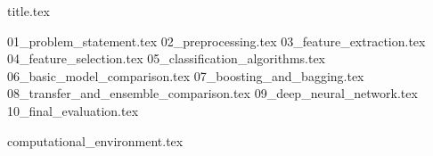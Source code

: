 \documentclass[a4paper,11pt]{article}
\begin{document}
\hypersetup{pageanchor=false}
{title.tex}

\frontmatter
\hypersetup{pageanchor=true}
\tableofcontents
\listoffigures
\listoftables

\mainmatter

{01_problem_statement.tex}
{02_preprocessing.tex}
{03_feature_extraction.tex}
{04_feature_selection.tex}
{05_classification_algorithms.tex}
{06_basic_model_comparison.tex}
{07_boosting_and_bagging.tex}
{08_transfer_and_ensemble_comparison.tex}
{09_deep_neural_network.tex}
{10_final_evaluation.tex}

\clearpage
\printbibliography[heading=bibintoc,title={Bibliography}]

\clearpage
\appendix
{computational_environment.tex}

\end{document}
